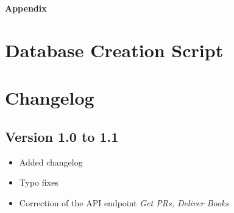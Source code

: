 \documentclass[a4paper, 11pt, oneside, openright, english]{book}
\begin{document}


\tableofcontents






\appendix
\newpage
\thispagestyle{empty}
\vspace*{\fill}
\begin{center}
    \Huge\textbf{Appendix}
\end{center}
\vspace*{\fill}
\newpage

\chapter{Database Creation Script}


\chapter{Changelog}
\section{Version 1.0 to 1.1}
\begin{itemize}
    \item Added changelog
    \item Typo fixes
    \item Correction of the API endpoint \textit{Get PRs, Deliver Books}
\end{itemize}
\end{document}
